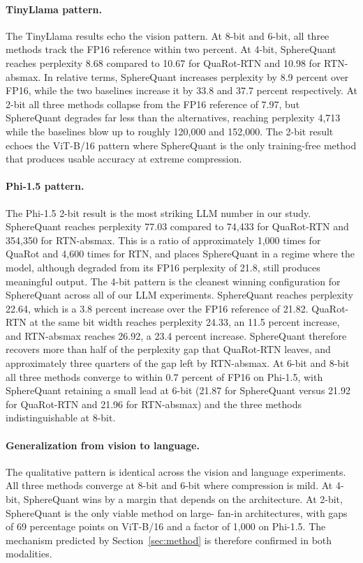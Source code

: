 \paragraph{TinyLlama pattern.}
The TinyLlama results echo the vision pattern. At 8-bit and 6-bit, all
three methods track the FP16 reference within two percent. At 4-bit,
SphereQuant reaches perplexity 8.68 compared to 10.67 for QuaRot-RTN and 10.98
for RTN-absmax. In relative terms, SphereQuant increases perplexity by 8.9
percent over FP16, while the two baselines increase it by 33.8 and
37.7 percent respectively. At 2-bit all three methods collapse from
the FP16 reference of 7.97, but SphereQuant degrades far less than the
alternatives, reaching perplexity 4,713 while the baselines blow up to
roughly 120,000 and 152,000. The 2-bit result echoes the ViT-B/16
pattern where SphereQuant is the only training-free method that produces
usable accuracy at extreme compression.

\paragraph{Phi-1.5 pattern.}
The Phi-1.5 2-bit result is the most striking LLM number in our
study. SphereQuant reaches perplexity 77.03 compared to 74,433 for QuaRot-RTN
and 354,350 for RTN-absmax. This is a ratio of approximately 1,000
times for QuaRot and 4,600 times for RTN, and places SphereQuant in a regime
where the model, although degraded from its FP16 perplexity of 21.8,
still produces meaningful output. The 4-bit pattern is the cleanest
winning configuration for SphereQuant across all of our LLM experiments. SphereQuant
reaches perplexity 22.64, which is a 3.8 percent increase over the
FP16 reference of 21.82. QuaRot-RTN at the same bit width reaches
perplexity 24.33, an 11.5 percent increase, and RTN-absmax reaches
26.92, a 23.4 percent increase. SphereQuant therefore recovers more than half
of the perplexity gap that QuaRot-RTN leaves, and approximately three
quarters of the gap left by RTN-absmax. At 6-bit and 8-bit all three
methods converge to within 0.7 percent of FP16 on Phi-1.5, with SphereQuant
retaining a small lead at 6-bit (21.87 for SphereQuant versus 21.92 for
QuaRot-RTN and 21.96 for RTN-absmax) and the three methods
indistinguishable at 8-bit.

\paragraph{Generalization from vision to language.}
The qualitative pattern is identical across the vision and language
experiments. All three methods converge at 8-bit and 6-bit where
compression is mild. At 4-bit, SphereQuant wins by a margin that depends on
the architecture. At 2-bit, SphereQuant is the only viable method on large-
fan-in architectures, with gaps of 69 percentage points on ViT-B/16
and a factor of 1,000 on Phi-1.5. The mechanism predicted by
Section~\ref{sec:method} is therefore confirmed in both modalities.

